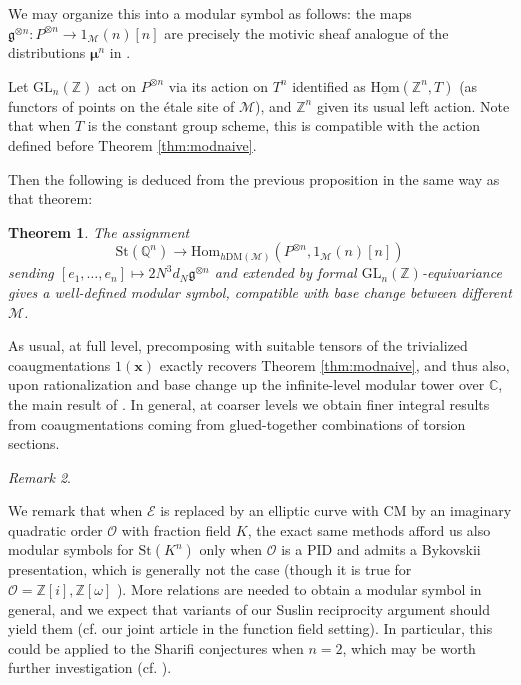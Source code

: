 \documentclass[a4paper,reqno,11pt]{amsart}
\theoremstyle{plain}
\newtheorem{theorem}{Theorem}[section]
\theoremstyle{definition}
\theoremstyle{remark}
\newtheorem{remarkwr}[theorem]{Remark}
\newenvironment{remark}{\begin{remarkwr}\begin{upshape}}{\end{upshape}\end{remarkwr}}
\newcommand{\Z}{\mathbb{Z}}
\newcommand{\Q}{\mathbb{Q}}
\newcommand{\DM}{\mathrm{DM}}
\newcommand{\GL}{\mathrm{GL}}
\newcommand{\Hom}{\mathrm{Hom}}
\begin{document}
We may organize this into a modular symbol as follows: the maps $\mathfrak{g}^{\otimes n}:P^{\otimes n} \to 1_{\mathcal{M}}(n)[n]$ are precisely the motivic sheaf analogue of the distributions $\boldsymbol{\mu}^n$ in \cite{BPPS}. 

Let $\GL_n(\Z)$ act on $P^{\otimes n}$ via its action on $T^n$ identified as $\underline{\Hom}(\Z^n, T)$ (as functors of points on the \'{e}tale site of $\mathcal{M}$), and $\Z^n$ given its usual left action. Note that when $T$ is the constant group scheme, this is compatible with the action defined before Theorem \ref{thm:modnaive}. 

Then the following is deduced from the previous proposition in the same way as that theorem:

\begin{theorem} \label{thm:mod}
     The assignment 
     \[
     \mathrm{St}(\Q^n) \to \Hom_{h\DM(\mathcal{M})}(P^{\otimes n}, 1_{\mathcal{M}}(n)[n])
     \]
     sending $[e_1,\ldots, e_n]\mapsto 2N^3 d_N\mathfrak{g}^{\otimes n}$ and extended by formal $\GL_n(\Z)$-equivariance gives a well-defined modular symbol, compatible with base change between different $\mathcal{M}$.
\end{theorem}

As usual, at full level, precomposing with suitable tensors of the trivialized coaugmentations $1(\mathbf{x})$ exactly recovers Theorem \ref{thm:modnaive}, and thus also, upon rationalization and base change up the infinite-level modular tower over $\mathbb{C}$, the main result of \cite{BPPS}. In general, at coarser levels we obtain finer integral results from coaugmentations coming from glued-together combinations of torsion sections.

\begin{remark}
We remark that when $\mathcal{E}$ is replaced by an elliptic curve with CM by an imaginary quadratic order $\mathcal{O}$ with fraction field $K$, the exact same methods afford us also modular symbols for $\mathrm{St}(K^n)$ only when $\mathcal{O}$ is a PID and admits a Bykovskii presentation, which is generally not the case (though it is true for $\mathcal{O}=\Z[i],\Z[\omega]$ \cite{KMPW}). More relations are needed to obtain a modular symbol in general, and we expect that variants of our Suslin reciprocity argument should yield them (cf. our joint article \cite{SX} in the function field setting). In particular, this could be applied to the Sharifi conjectures when $n=2$, which may be worth further investigation (cf. \cite{LSSW}).
\end{remark}

{
\printbibliography
}
\end{document}
